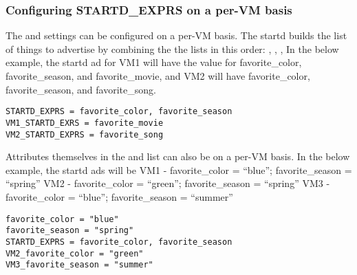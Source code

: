 \subsubsection{\label{sec:SMP-exps}
Configuring STARTD\_EXPRS on a per-VM basis}

The  and  settings can be configured on 
a per-VM basis.
The startd builds the list of things to advertise by combining
the the lists in this order: , ,
,  
In the below example, the startd ad for VM1 will have the value for 
favorite\_color, favorite\_season, and favorite\_movie, and VM2 will have 
favorite\_color, favorite\_season, and favorite\_song.

\begin{verbatim}
STARTD_EXPRS = favorite_color, favorite_season
VM1_STARTD_EXRS = favorite_movie
VM2_STARTD_EXPRS = favorite_song
\end{verbatim}

Attributes themselves in the  and  list 
can also be on a per-VM basis.  
In the below example, the startd ads will be
VM1 - favorite\_color = ``blue''; favorite\_season = ``spring''
VM2 - favorite\_color = ``green''; favorite\_season = ``spring''
VM3 - favorite\_color = ``blue''; favorite\_season = ``summer''

\begin{verbatim}
favorite_color = "blue"
favorite_season = "spring"
STARTD_EXPRS = favorite_color, favorite_season
VM2_favorite_color = "green"
VM3_favorite_season = "summer"
\end{verbatim}


